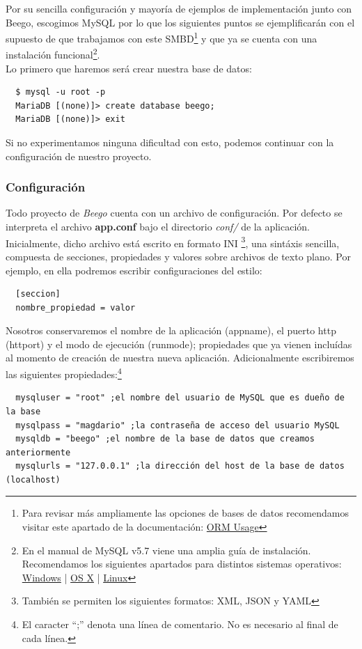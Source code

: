 \documentclass[12pt]{article}
\begin{document}
Por su sencilla configuración y mayoría de ejemplos de implementación junto con
Beego, escogimos MySQL por lo que los siguientes puntos se ejemplificarán
con el supuesto de que trabajamos con este SMBD\footnote{Para revisar más ampliamente
  las opciones de bases de datos recomendamos visitar este apartado de la documentación:
  \href{http://beego.me/docs/mvc/model/orm.md\#set-up-database}{ORM Usage}} y que ya se cuenta con una instalación
funcional\footnote{En el manual de MySQL v5.7 viene una amplia guía de instalación.
  Recomendamos los siguientes apartados para distintos sistemas operativos:
  \href{http://dev.mysql.com/doc/refman/5.7/en/windows-installation.html}{Windows} |
  \href{http://dev.mysql.com/doc/refman/5.7/en/osx-installation.html}{OS X} |
  \href{http://dev.mysql.com/doc/refman/5.7/en/linux-installation.html}{Linux}}.\\[2mm]
Lo primero que haremos será crear nuestra base de datos:
\begin{verbatim}
  $ mysql -u root -p
  MariaDB [(none)]> create database beego;
  MariaDB [(none)]> exit
\end{verbatim}
Si no experimentamos ninguna dificultad con esto, podemos continuar con la
configuración de nuestro proyecto.
\subsubsection*{Configuración}
Todo proyecto de \textit{Beego} cuenta con un archivo de configuración.
Por defecto se interpreta el archivo \textbf{app.conf} bajo el directorio
\textit{conf/} de la aplicación. Inicialmente, dicho archivo está escrito en formato INI
\footnote{También se permiten los siguientes formatos: XML, JSON y YAML},
una sintáxis sencilla, compuesta de
secciones, propiedades y valores sobre archivos de texto plano. Por ejemplo, en ella podremos escribir
configuraciones del estilo:
\begin{verbatim}
  [seccion]
  nombre_propiedad = valor
\end{verbatim}

Nosotros conservaremos el nombre de la aplicación (appname), el puerto http
(httport) y el modo de ejecución (runmode); propiedades que ya vienen incluídas
al momento de creación de nuestra nueva aplicación. Adicionalmente
escribiremos las siguientes propiedades:\footnote{El caracter ``;'' denota una línea de comentario. No es necesario
  al final de cada línea. }
\begin{verbatim}
  mysqluser = "root" ;el nombre del usuario de MySQL que es dueño de la base
  mysqlpass = "magdario" ;la contraseña de acceso del usuario MySQL
  mysqldb = "beego" ;el nombre de la base de datos que creamos anteriormente
  mysqlurls = "127.0.0.1" ;la dirección del host de la base de datos (localhost)
\end{verbatim}
\end{document}
